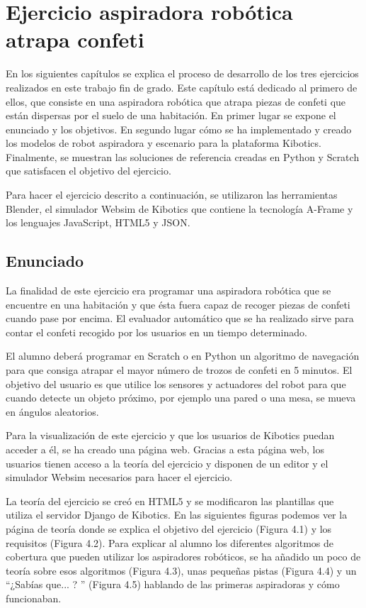 \chapter{Ejercicio aspiradora robótica atrapa confeti}\label{chap:aspiradora}
En los siguientes capítulos se explica el proceso de desarrollo de los tres ejercicios realizados en este trabajo fin de grado. Este capítulo está dedicado al primero de ellos, que consiste en una aspiradora robótica que atrapa piezas de confeti que están dispersas por el suelo de una habitación. En primer lugar se expone el enunciado y los objetivos. En segundo lugar cómo se ha implementado y creado los modelos de robot aspiradora y escenario para la plataforma Kibotics. Finalmente, se muestran las soluciones de referencia creadas en Python y Scratch que satisfacen el objetivo del ejercicio.

Para hacer el ejercicio descrito a continuación, se utilizaron las herramientas Blender, el simulador Websim de Kibotics que contiene la tecnología A-Frame y los lenguajes JavaScript, HTML5 y JSON.

\section{Enunciado}
La finalidad de este ejercicio era programar una aspiradora robótica que se encuentre en una habitación y que ésta fuera capaz de recoger piezas de confeti cuando pase por encima. El evaluador automático que se ha realizado sirve para contar el confeti recogido por los usuarios en un tiempo determinado.

El alumno deberá programar en Scratch o en Python un algoritmo de navegación para que consiga atrapar el mayor número de trozos de confeti en 5 minutos. El objetivo del usuario es que utilice los sensores y actuadores del robot para que cuando detecte un objeto próximo, por ejemplo una pared o una mesa, se mueva en ángulos aleatorios. 

Para la visualización de este ejercicio y que los usuarios de Kibotics puedan acceder a él, se ha creado una página web. Gracias a esta página web, los usuarios tienen acceso a la teoría del ejercicio y  disponen de un editor y el simulador Websim necesarios para hacer el ejercicio. 

La teoría del ejercicio se creó en HTML5 y se modificaron las plantillas que utiliza el servidor Django de Kibotics.
En las siguientes figuras podemos ver la página de teoría donde se explica el objetivo del ejercicio (Figura 4.1) y los requisitos (Figura 4.2). Para explicar al alumno los diferentes algoritmos de cobertura que pueden utilizar los aspiradores robóticos, se ha añadido un poco de teoría sobre esos algoritmos (Figura  4.3), unas pequeñas pistas (Figura 4.4) y un ``¿Sabías que... ? '' (Figura 4.5) hablando de las primeras aspiradoras y cómo funcionaban. 
\\

